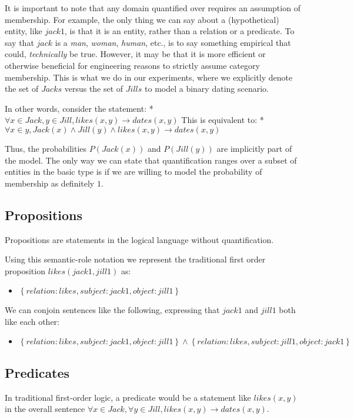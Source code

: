 \documentclass[12pt]{article}
\begin{document}
It is important to note that any domain quantified over requires an assumption of membership.
For example, the only thing we can say about a (hypothetical) entity, like \( jack1 \), is that it is an entity, rather than a relation or a predicate.
To say that \( jack \) is a \emph{man}, \emph{woman}, \emph{human}, etc., is to say something empirical that could, \emph{technically} be true.
However, it may be that it is more efficient or otherwise beneficial for engineering reasons to strictly assume category membership.
This is what we do in our experiments, where we explicitly denote the set of \( Jacks \) versus the set of \( Jills \) to model a binary dating scenario.

In other words, consider the statement:
* $\forall x \in Jack, y \in Jill, likes(x, y) \rightarrow dates(x, y)$
This is equivalent to:
* $\forall x \in  y, Jack(x) \wedge Jill(y) \wedge likes(x, y) \rightarrow dates(x, y)$

Thus, the probabilities $P(Jack(x))$ and $P(Jill(y))$ are implicitly part of the model.
The only way we can state that quantification ranges over a subset of entities in the basic type is if we are willing to model the probability of membership as definitely $1$.

\subsection{Propositions}
Propositions are statements in the logical language without quantification.

Using this semantic-role notation we represent the traditional first order proposition $likes(jack1, jill1)$ as:
\begin{itemize}
    \item $\left\{relation:likes, subject:jack1, object:jill1 \right\}$
\end{itemize}

We can conjoin sentences like the following, expressing that $jack1$ and $jill1$ both like each other:
\begin{itemize}
    \item $\left\{relation:likes, subject:jack1, object:jill1 \right\} \wedge \left\{relation:likes, subject:jill1, object:jack1 \right\}$
\end{itemize}

\subsection{Predicates}
In traditional first-order logic, a predicate would be a statement like $likes(x, y)$ in the overall sentence $\forall x\in Jack, \forall y \in Jill, likes(x,y) \rightarrow dates(x, y)$.
\end{document}
